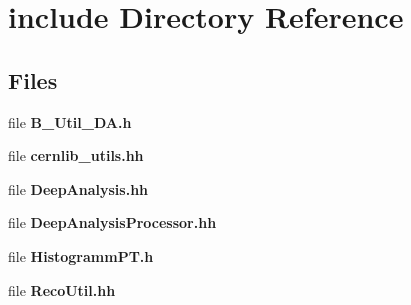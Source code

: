 \section{include Directory Reference}
\label{dir_dc46692996f7b415dd8d5db6a17f2354}
\subsection*{Files}
\begin{DoxyCompactItemize}
\item 
file {\bfseries B\-\_\-\-Util\-\_\-\-D\-A.\-h}
\item 
file {\bfseries cernlib\-\_\-utils.\-hh}
\item 
file {\bfseries Deep\-Analysis.\-hh}
\item 
file {\bfseries Deep\-Analysis\-Processor.\-hh}
\item 
file {\bfseries Histogramm\-P\-T.\-h}
\item 
file {\bfseries Reco\-Util.\-hh}
\end{DoxyCompactItemize}

